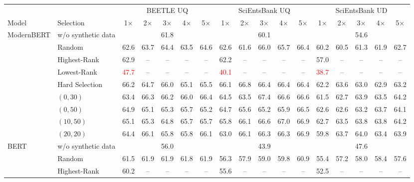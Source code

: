 \begin{table}[t]
\centering
\footnotesize
\setlength{\tabcolsep}{2pt}
\begin{tabular}{llccccccccccccccc}
\toprule
 & & \multicolumn{5}{c}{BEETLE UQ} & \multicolumn{5}{c}{SciEntsBank UQ} & \multicolumn{5}{c}{SciEntsBank UD} \\
\cmidrule(lr){3-7}\cmidrule(lr){8-12}\cmidrule(lr){13-17}
Model & Selection & 1$\times$ & 2$\times$ & 3$\times$ & 4$\times$ & 5$\times$ & 1$\times$ & 2$\times$ & 3$\times$ & 4$\times$ & 5$\times$ & 1$\times$ & 2$\times$ & 3$\times$ & 4$\times$ & 5$\times$ \\
\midrule
\multirow{9}{*}{ModernBERT} & w/o synthetic data & \multicolumn{5}{c}{61.8} & \multicolumn{5}{c}{60.1} & \multicolumn{5}{c}{54.6} \\
 & Random & 62.6 & 63.7 & 64.4 & 63.5 & 64.6 & 62.6 & 61.6 & 66.0 & 65.7 & 66.4 & 60.2 & 60.5 & 61.3 & 61.9 & 62.7 \\
 & Highest-Rank & 62.9 & -- & -- & -- & -- & 62.2 & -- & -- & -- & -- & 57.0 & -- & -- & -- & -- \\
 & Lowest-Rank & \textcolor{red}{47.7} & -- & -- & -- & -- & \textcolor{red}{40.1} & -- & -- & -- & -- & \textcolor{red}{38.7} & -- & -- & -- & -- \\
 & Hard Selection & 66.2 & 64.7 & 66.0 & 65.1 & 65.5 & 66.1 & 66.8 & 66.4 & 66.4 & 66.4 & 62.2 & 63.6 & 63.0 & 62.9 & 63.2 \\
 & $(0, 30)$ & 63.4 & 66.3 & 66.2 & 66.0 & 66.4 & 64.5 & 63.5 & 67.4 & 66.6 & 66.6 & 61.5 & 62.7 & 63.9 & 63.5 & 64.2 \\
 & $(0, 50)$ & 64.9 & 65.1 & 65.3 & 65.7 & 65.2 & 64.7 & 65.6 & 65.2 & 65.9 & 66.5 & 62.6 & 62.6 & 63.2 & 63.7 & 64.1 \\
 & $(10, 50)$ & 65.1 & 65.3 & 64.8 & 65.7 & 65.7 & 65.8 & 66.1 & 66.6 & 67.0 & 66.9 & 62.7 & 63.5 & 63.8 & 63.8 & 64.2 \\
 & $(20, 20)$ & 64.4 & 66.1 & 65.8 & 65.8 & 66.1 & 63.0 & 66.1 & 66.3 & 66.3 & 66.9 & 59.8 & 63.7 & 64.0 & 63.4 & 63.9 \\
\midrule
\multirow{9}{*}{BERT} & w/o synthetic data & \multicolumn{5}{c}{56.0} & \multicolumn{5}{c}{43.9} & \multicolumn{5}{c}{47.6} \\
 & Random & 61.5 & 61.9 & 61.9 & 61.8 & 61.9 & 56.3 & 57.9 & 59.0 & 59.8 & 60.9 & 55.4 & 57.2 & 58.0 & 58.4 & 57.6 \\
 & Highest-Rank & 60.2 & -- & -- & -- & -- & 55.6 & -- & -- & -- & -- & 52.5 & -- & -- & -- & -- \\

\end{tabular}
\end{table}
